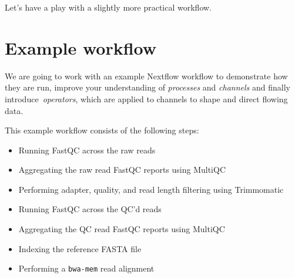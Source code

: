 Let's have a play with a slightly more practical workflow.




\newpage

\section{Example workflow}

We are going to work with an example Nextflow workflow to demonstrate how they are run, 
improve your understanding of \emph{processes} and \emph{channels} and finally introduce\ \emph{operators}, which are applied to channels to shape and direct flowing data.


This example workflow consists of the following steps:

\begin{itemize}
  \item Running FastQC across the raw reads
  \item Aggregating the raw read FastQC reports using MultiQC
  \item Performing adapter, quality, and read length filtering using Trimmomatic
  \item Running FastQC across the QC'd reads
  \item Aggregating the QC read FastQC reports using MultiQC
  \item Indexing the reference FASTA file
  \item Performing a \texttt{bwa-mem} read alignment
\end{itemize}


